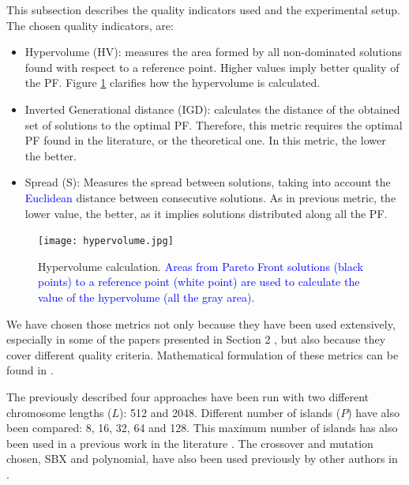 \documentclass[preprint]{elsarticle}
\begin{document}
This subsection describes the quality indicators used and the experimental setup. The chosen quality indicators, are:

\begin{itemize}
\item Hypervolume (HV): measures the area formed by all non-dominated solutions found with respect to a reference point. Higher values imply better quality of the PF. Figure \ref{fig:hypervolume} clarifies how the hypervolume is calculated.
\item Inverted Generational distance (IGD): calculates the distance of the obtained set of solutions to the optimal PF. Therefore, this metric requires the optimal PF found in the literature, or the theoretical one. In this metric, the lower the better. %
\item Spread (S): Measures the spread between solutions, taking into account the \textcolor{blue}{Euclidean} distance between consecutive solutions. As in previous metric, the lower value, the better, as it implies solutions distributed along all the PF.
\end{itemize}

\begin{figure}
\centering
\texttt{[image: hypervolume.jpg]}
\caption{Hypervolume calculation. \textcolor{blue}{Areas from Pareto Front solutions (black points) to a reference point (white point) are used to calculate the value of the hypervolume (all the gray area)}.}
\label{fig:hypervolume}
\end{figure}


We have chosen those metrics not only because they have been used
extensively, especially in some of the papers presented in Section 2
\cite{Dorronsoro13superlinear,Durillo08masterslave,Hiroyasu07discussion,Wang09parallel,Martens13asynchronous},
but also because they cover different quality criteria. Mathematical
formulation of these metrics can be found in
\cite{Dorronsoro13superlinear}. 



The previously described four approaches have been run with two
different chromosome lengths ($L$): 512 and 2048. Different number of
islands ($P$) have also been compared: 8, 16, 32, 64 and 128. This
maximum number of islands has also been  used in a previous work in the
literature \cite{Martens13asynchronous}. The crossover and mutation
chosen, SBX and polynomial, have also been  used previously by other
authors in \cite{Durillo08masterslave,CaoZLL17}.  %
\end{document}
